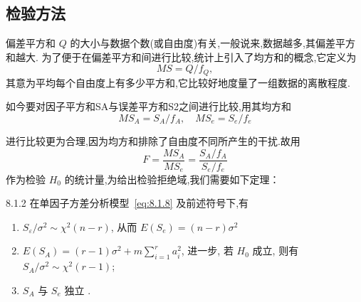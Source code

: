 \subsection{检验方法}

偏差平方和 $Q$ 的大小与数据个数(或自由度)有关,一般说来,数据越多,其偏差平方和越大. 为了便于在偏差平方和间进行比较,统计上引入了均方和的概念,它定义为 
\begin{equation*}
  MS=Q/f_Q,
\end{equation*}
其意为平均每个自由度上有多少平方和,它比较好地度量了一组数据的离散程度. 

如今要对因子平方和SA与误差平方和S2之间进行比较,用其均方和
\begin{equation*}
  MS_{A}=S_A / f_A, \quad MS_{e}=S_{e}/f_{e}
\end{equation*}


进行比较更为合理,因为均方和排除了自由度不同所产生的干扰.故用
\begin{equation}\label{eq:8.1.17}
  F = \frac{MS_{A}}{MS_{e}} = \frac{S_A/f_A}{S_e/f_e}
\end{equation}
作为检验 $H_0$ 的统计量,为给出检验拒绝域,我们需要如下定理：

\begin{theorem}{}{8.1.2}
  在单因子方差分析模型~\eqref{eq:8.1.8} 及前述符号下,有
  \begin{enumerate}
    \item $S_{\varepsilon} / \sigma^{2} \sim \chi^{2}(n-r)$, 从而 $E(S_{e})=(n-r) \sigma^{2}$ \label{enum:8.1.2.1}
    \item $E(S_{A})=(r-1) \sigma^{2} + m \sum\limits_{i=1}^{r} a_{i}^{2}$, 进一步, 若 $H_0$ 成立, 则有 $S_{A} / \sigma^{2} \sim \chi^{2}(r-1)$;\label{enum:8.1.2.2} 
    \item $S_A$ 与 $S_e$ 独立 \label{enum:8.1.2.3}.
  \end{enumerate}
\end{theorem}

